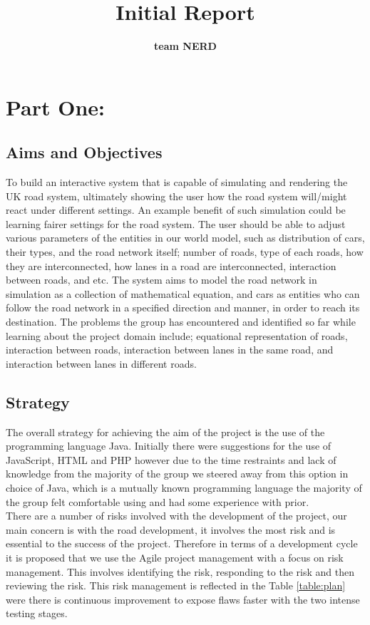\documentclass[a4paper,11pt]{article}
\begin{document}
\title{\Huge Initial Report}
\author{\bf{team NERD}}
\maketitle

\section[short]{Part One:}
\subsection{Aims and Objectives}%
To build an interactive system that is capable of simulating and rendering the UK road system, ultimately showing the user how the road system will/might react under different settings. An example benefit of such simulation could be learning fairer settings for the road system. The user should be able to adjust various parameters of the entities in our world model, such as distribution of cars, their types, and the road network itself; number of roads, type of each roads, how they are interconnected, how lanes in a road are interconnected, interaction between roads, and etc. The system aims to model the road network in simulation as a collection of mathematical equation, and cars as entities who can follow the road network in a specified direction and manner, in order to reach its destination.
The problems the group has encountered and identified so far while learning about the project domain include; equational representation of roads, interaction between roads, interaction between lanes in the same road, and interaction between lanes in different roads.

\subsection{Strategy}%
The overall strategy for achieving the aim of the project is the use of the programming language Java. Initially there were suggestions for the use of JavaScript, HTML and PHP however due to the time restraints and lack of knowledge from the majority of the group we steered away from this option in choice of Java, which is a mutually known programming language the majority of the group felt comfortable using and had some experience with prior.\\There are a number of risks involved with the development of the project, our main concern is with the road development, it involves the most risk and is essential to the success of the project. Therefore in terms of a development cycle it is proposed that we use the Agile project management with a focus on risk management. This involves identifying the risk, responding to the risk and then reviewing the risk. This risk management is reflected in the Table \ref{table:plan} were there is continuous improvement to expose flaws faster with the two intense testing stages.
\end{document}
